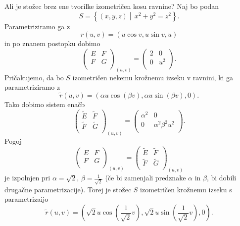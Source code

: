 \begin{primer}
 Ali je stožec brez ene tvorilke izometričen kosu ravnine? Naj bo podan 
 \begin{equation*} S = \left\{ (x,y,z)  \middle|\, x^2 + y^2  = z^2 \right\}.\end{equation*}
 Parametriziramo ga z
 \begin{equation*} r(u,v) = (u \cos v, u \sin v, u) \end{equation*}in po znanem postopku dobimo 
 \begin{equation*} \begin{pmatrix}
  E & F\\
  F & G\\
 \end{pmatrix}_{(u,v)} 
 = \begin{pmatrix}
  2 & 0\\
  0 & u^2\\
 \end{pmatrix}.\end{equation*}
Pričakujemo, da bo $S$ izometričen nekemu krožnemu izseku v ravnini, ki ga parametriziramo z 
\begin{equation*} \tilde{r}(u,v) = (\alpha u \cos(\beta v), \alpha u \sin(\beta v), 0).\end{equation*}Tako dobimo sistem enačb 
\begin{equation*} \begin{pmatrix}
  \tilde{E} & \tilde{F}\\
  \tilde{F} & \tilde{G}\\
 \end{pmatrix}_{(u,v)} 
 = \begin{pmatrix}
  \alpha^2 & 0\\
  0 & \alpha^2 \beta^2 u^2\\
 \end{pmatrix}.\end{equation*}
Pogoj  \begin{equation*} \begin{pmatrix}
  E & F\\
  F & G\\
 \end{pmatrix}_{(u,v)}
 = \begin{pmatrix}
  \tilde{E} & \tilde{F}\\
  \tilde{F} & \tilde{G}\\
 \end{pmatrix}_{(u,v)}\end{equation*}je izpolnjen pri $\alpha = \sqrt{2},\, \beta = \frac{1}{\sqrt{2}}$ (če bi zamenjali predznake $\alpha$ in $\beta$, bi dobili drugačne parametrizacije).
 Torej je stožec $S$ izometričen krožnemu izseku s parametrizaijo  
 \begin{equation*} \tilde{r}(u,v) = \left(\sqrt{2}  u \cos(\frac{1}{\sqrt{2}} v), \sqrt{2}  u \sin(\frac{1}{\sqrt{2}} v), 0 \right).\end{equation*}
\end{primer}

